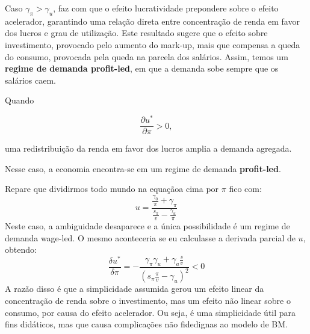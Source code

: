 \documentclass[
  brazilian,
  letterpaper,
  DIV=11,
  numbers=noendperiod]{scrreprt}
\begin{document}
Caso \(\gamma_\pi > \gamma_u\), faz com que o efeito lucratividade
prepondere sobre o efeito acelerador, garantindo uma relação direta
entre concentração de renda em favor dos lucros e grau de utilização.
Este resultado sugere que o efeito sobre investimento, provocado pelo
aumento do mark-up, mais que compensa a queda do consumo, provocada pela
queda na parcela dos salários. Assim, temos um \textbf{regime de demanda
profit-led}, em que a demanda sobe sempre que os salários caem.

\begin{tcolorbox}[enhanced jigsaw, arc=.35mm, bottomrule=.15mm, bottomtitle=1mm, breakable, colback=white, colbacktitle=quarto-callout-note-color!10!white, colframe=quarto-callout-note-color-frame, coltitle=black, left=2mm, leftrule=.75mm, opacityback=0, opacitybacktitle=0.6, rightrule=.15mm, title=\textcolor{quarto-callout-note-color}{\faInfo}\hspace{0.5em}{Regime de demanda \emph{profit-led}}, titlerule=0mm, toprule=.15mm, toptitle=1mm]

Quando

\[\frac{\partial u^{*}}{\partial\pi}>0,\]

uma redistribuição da renda em favor dos lucros amplia a demanda
agregada.

Nesse caso, a economia encontra-se em um regime de demanda
\textbf{profit-led}.

\end{tcolorbox}

\begin{tcolorbox}[enhanced jigsaw, arc=.35mm, bottomrule=.15mm, bottomtitle=1mm, breakable, colback=white, colbacktitle=quarto-callout-note-color!10!white, colframe=quarto-callout-note-color-frame, coltitle=black, left=2mm, leftrule=.75mm, opacityback=0, opacitybacktitle=0.6, rightrule=.15mm, title=\textcolor{quarto-callout-note-color}{\faInfo}\hspace{0.5em}{Sobre a contradição adotada na linearidade hipotética}, titlerule=0mm, toprule=.15mm, toptitle=1mm]

Repare que dividirmos todo mundo na equaçãoa cima por \(\pi\) fico com:
\[u=\frac{\frac{\gamma_0}{\pi} + \gamma_\pi}{\frac{s_\pi}{v}-\frac{\gamma_u}{\pi}}\]
Neste caso, a ambiguidade desaparece e a única possibilidade é um regime
de demanda wage-led. O mesmo aconteceria se eu calculasse a derivada
parcial de \(u\), obtendo:
\[\frac{\delta u^{*}}{\delta \pi}= - \frac{\gamma_\pi \gamma_u +\gamma_a \frac{s}{v}}{\left( 
s_\pi \frac{\pi}{v} - \gamma_u \right)^2}<0\] A razão disso é que a
simplicidade assumida gerou um efeito linear da concentração de renda
sobre o investimento, mas um efeito não linear sobre o consumo, por
causa do efeito acelerador. Ou seja, é uma simplicidade útil para fins
didáticos, mas que causa complicações não fidedignas ao modelo de BM.

\end{tcolorbox}
\end{document}
